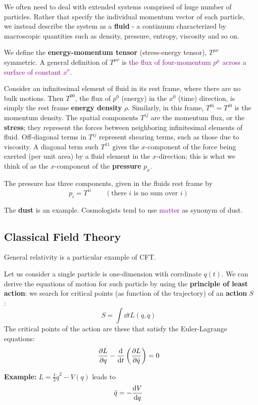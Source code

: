 We often need to deal with extended systems comprised of huge number of particles. Rather that specify the individual momentum vector of each particle, we instead describe the system as a \textbf{fluid} - a continuum characterized by macroscopic quantities such as density, pressure, entropy, viscosity and so on.

We define the \textbf{energy-momentum tensor} (stress-energy tensor), $T^{\mu\nu}$ symmetric. A general definition of $T^{\mu\nu}$ is \textcolor{purple}{the flux of four-momentum $p^\mu$ across a surface of constant $x^\nu$}.

Consider an infinitesimal element of fluid in its rest frame, where there are no bulk motions. Then $T^{00}$, the flux of $p^0$ (energy) in the $x^0$ (time) direction, is simply the rest frame \textbf{energy density} $\rho$. Similarly, in this frame, $T^{0i}=T^{i0}$ is the momentum density. The spatial components $T^{ij}$ are the momentum flux, or the \textbf{stress}; they represent the forces between neighboring infinitesimal elements of fluid. Off-diagonal terms in $T^{ij}$ represent shearing terms, such as those due to viscosity. A diagonal term such $T^{11}$ gives the $x$-component of the force being exerted (per unit area) by a fluid element in the $x$-direction; this is what we think of as the $x$-component of the \textbf{pressure} $p_x$.

The pressure has three components, given in the fluids rest frame by
\begin{equation*}
    p_i=T^{ii} \qquad (\text{there $i$ is no sum over $i$})
\end{equation*}

\begin{tcolorbox}
    The \textbf{dust} is an example. Cosmologists tend to use \textcolor{purple}{matter} as synonym of dust.
\end{tcolorbox}

\subsection{Classical Field Theory}
General relativity is a particular example of CFT.

Let us consider a single particle is one-dimension with corrdinate $q(t)$. We can derive the equations of motion for such particle by using the \textbf{principle of least action}: we search for critical points (as function of the trajectory) of an \textbf{action} $S$:
\begin{equation*}
    S=\int\dd t L(q,\dot{q})
\end{equation*}
The critical points of the action are these that satisfy the Euler-Lagrange equations:
\begin{equation*}
    \pdv{L}{q}-\dv{t}\left(\pdv{L}{\dot{q}}\right)=0
\end{equation*}
\begin{tcolorbox}
    \textbf{Example:} $L=\frac{1}{2}\dot{q}^2-V(q)$ leads to
    \begin{equation*}
        \ddot{q}=-\dv{V}{q}
    \end{equation*}
\end{tcolorbox}

